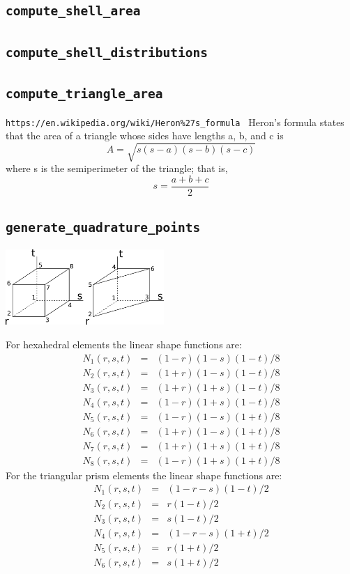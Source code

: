  \subsection{\tt compute\_shell\_area}
 \subsection{\tt compute\_shell\_distributions}
 \subsection{\tt compute\_triangle\_area}
 {\tt https://en.wikipedia.org/wiki/Heron\%27s\_formula }
 Heron's formula states that the area of a triangle whose sides have lengths a, b, and c is
 \[
 A=\sqrt{s(s-a)(s-b)(s-c)}
 \]
 where s is the semiperimeter of the triangle; that is,
 \[
 s=\frac{a+b+c}{2}
 \]
 \subsection{\tt generate\_quadrature\_points}
 \begin{center}
 \includegraphics[width=6cm]{images/elements}
 \end{center}
 For hexahedral elements the linear shape functions are:
 \begin{eqnarray}
 N_1(r,s,t) &=& (1-r)(1-s)(1-t)/8 \nonumber\\ 
 N_2(r,s,t) &=& (1+r)(1-s)(1-t)/8 \nonumber\\ 
 N_3(r,s,t) &=& (1+r)(1+s)(1-t)/8 \nonumber\\ 
 N_4(r,s,t) &=& (1-r)(1+s)(1-t)/8 \nonumber\\ 
 N_5(r,s,t) &=& (1-r)(1-s)(1+t)/8 \nonumber\\ 
 N_6(r,s,t) &=& (1+r)(1-s)(1+t)/8 \nonumber\\ 
 N_7(r,s,t) &=& (1+r)(1+s)(1+t)/8 \nonumber\\ 
 N_8(r,s,t) &=& (1-r)(1+s)(1+t)/8 \nonumber
 \end{eqnarray}
 For the triangular prism elements the linear shape functions are:
 \begin{eqnarray}
 N_1(r,s,t) &=& (1-r-s)(1-t)/2 \nonumber\\ 
 N_2(r,s,t) &=& r(1-t)/2 \nonumber\\ 
 N_3(r,s,t) &=& s(1-t)/2 \nonumber\\ 
 N_4(r,s,t) &=& (1-r-s)(1+t)/2 \nonumber\\ 
 N_5(r,s,t) &=& r(1+t)/2 \nonumber\\ 
 N_6(r,s,t) &=& s(1+t)/2 \nonumber
 \end{eqnarray}
